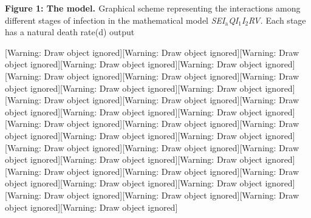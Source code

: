 \documentclass[a4paper]{article}
\providecommand\textsubscript[1]{\ensuremath{{}_{\text{#1}}}}
\begin{document}
\bigskip

\textbf{\textcolor[rgb]{0.07450981,0.078431375,0.07450981}{Figure 1: The model.
}}\textcolor[rgb]{0.07450981,0.078431375,0.07450981}{Graphical scheme representing the interactions among different
stages of infection in the mathematical model
}\textit{\textcolor[rgb]{0.07450981,0.078431375,0.07450981}{SEI}}\textit{\textcolor[rgb]{0.07450981,0.078431375,0.07450981}{\textsubscript{a}}}\textit{\textcolor[rgb]{0.07450981,0.078431375,0.07450981}{QI}}\textit{\textcolor[rgb]{0.07450981,0.078431375,0.07450981}{\textsubscript{1}}}\textit{\textcolor[rgb]{0.07450981,0.078431375,0.07450981}{I}}\textit{\textcolor[rgb]{0.07450981,0.078431375,0.07450981}{\textsubscript{2}}}\textit{\textcolor[rgb]{0.07450981,0.078431375,0.07450981}{RV.
}}\textcolor[rgb]{0.07450981,0.078431375,0.07450981}{Each stage has a natural death rate(d) output}

[Warning: Draw object ignored][Warning: Draw object ignored][Warning: Draw object ignored][Warning: Draw object
ignored][Warning: Draw object ignored][Warning: Draw object ignored][Warning: Draw object ignored][Warning: Draw object
ignored][Warning: Draw object ignored][Warning: Draw object ignored][Warning: Draw object ignored][Warning: Draw object
ignored][Warning: Draw object ignored][Warning: Draw object ignored][Warning: Draw object ignored][Warning: Draw object
ignored][Warning: Draw object ignored][Warning: Draw object ignored][Warning: Draw object ignored][Warning: Draw object
ignored][Warning: Draw object ignored][Warning: Draw object ignored][Warning: Draw object ignored][Warning: Draw object
ignored][Warning: Draw object ignored][Warning: Draw object ignored][Warning: Draw object ignored][Warning: Draw object
ignored][Warning: Draw object ignored][Warning: Draw object ignored][Warning: Draw object ignored][Warning: Draw object
ignored][Warning: Draw object ignored][Warning: Draw object ignored]


\bigskip


\bigskip


\bigskip


\bigskip


\bigskip


\bigskip


\bigskip


\bigskip


\bigskip


\bigskip


\bigskip


\bigskip


\bigskip
\end{document}
